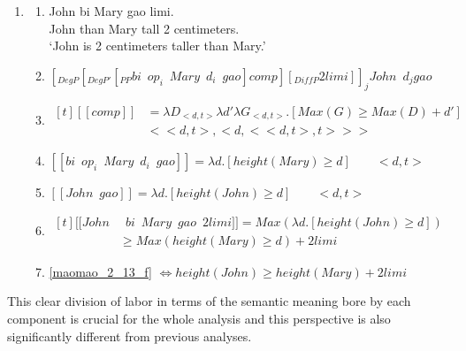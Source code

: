 \documentclass{ctexart}
\begin{document}
\begin{enumerate}
    \item \label{maomao_2_13}
    \begin{enumerate}
        \item \label{maomao_2_13_a}
        John \enspace bi \enspace Mary \enspace gao \enspace {} limi. \\
        John than Mary \enspace tall 2 centimeters. \\
        `John is 2 centimeters taller than Mary.'

        \item \label{maomao_2_13_b}
        $[_{DegP}[_{DegP'}[_{PP}bi \enspace op_i \enspace Mary \enspace d_i \enspace gao] comp][_{DiffP}2limi]]_j John \enspace d_j gao$

        \item \label{maomao_2_13_c}
        $\begin{aligned}[t]
            [\![comp]\!]&=\lambda D_{<d,t>} \lambda d' \lambda G_{<d,t>} . [Max(G) \geq Max(D) + d'] \\ & <<d,t>,<d,<<d,t>,t>>>
        \end{aligned}$

        \item \label{maomao_2_13_d}
        $[\![bi \enspace op_i \enspace Mary \enspace d_i \enspace gao]\!]
        = \lambda d.[height(Mary) \geq d] \qquad <d,t>$

        \item \label{maomao_2_13_e}
        $[\![John \enspace gao]\!] = \lambda d.[height(John) \geq d] \qquad <d,t>$

        \item \label{maomao_2_13_f}
        $\begin{aligned}[t]
            [\![John &\enspace bi \enspace Mary \enspace gao \enspace 2 limi]\!] 
            = Max(\lambda d.[height(John) \geq d]) \\ &\geq Max(height(Mary) \geq d) + 2limi
        \end{aligned}$

        \item \label{maomao_2_13_g}
        \ref{maomao_2_13_f} $\Leftrightarrow height(John) \geq height(Mary) + 2limi$

    \end{enumerate}
\end{enumerate}

This clear division of labor in terms of the semantic meaning bore by each component is crucial for the whole analysis and this perspective is also significantly different from previous analyses.
\end{document}
